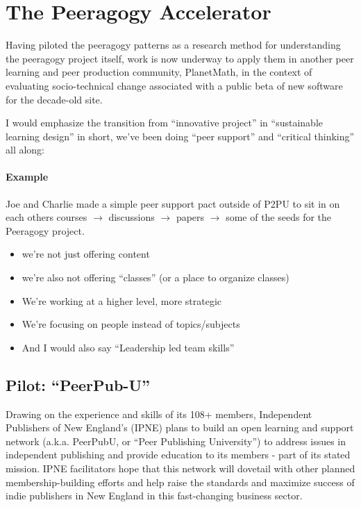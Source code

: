 \documentclass{acm_proc_article-sp}
\begin{document}
\section{The Peeragogy Accelerator}

Having piloted the peeragogy patterns as a research method for
understanding the peeragogy project itself, work is now underway to
apply them in another peer learning and peer production community,
PlanetMath, in the context of evaluating socio-technical change
associated with a public beta of new software for the decade-old site.

I would emphasize the transition from ``innovative project'' in
``sustainable learning design'' in short, we've been doing ``peer
support'' and ``critical thinking'' all along:

\paragraph{Example}
Joe and Charlie made a simple peer support pact outside of P2PU to sit
in on each others courses $\rightarrow$ discussions $\rightarrow$
papers $\rightarrow$ some of the seeds for the Peeragogy project.

\begin{itemize}
\item we're not just offering content
\item we're also not offering ``classes'' (or a place to organize classes)
\item We're working at a higher level, more strategic
\item We're focusing on people instead of topics/subjects
\item And I would also say ``Leadership led team skills''
\end{itemize}

\subsection{Pilot: ``PeerPub-U''}

Drawing on the experience and skills of its 108+ members, Independent
Publishers of New England's (IPNE) plans to build an open learning and
support network (a.k.a. PeerPubU, or ``Peer Publishing University'')
to address issues in independent publishing and provide education to
its members - part of its stated mission. IPNE facilitators hope that
this network will dovetail with other planned membership-building
efforts and help raise the standards and maximize success of indie
publishers in New England in this fast-changing business sector.
\end{document}
